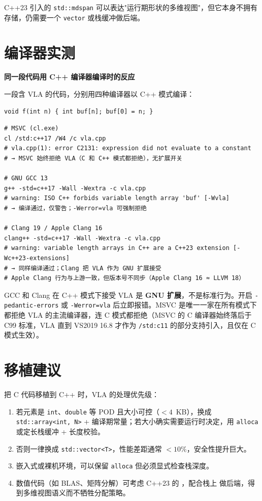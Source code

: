 \documentclass[12pt,a4paper,fontset=fandol]{ctexbook}
\newcommand{\clabel}{%
  \tcbox[on line,colback=cheadbg,colframe=cheadbg,
    boxrule=0pt,arc=1pt,left=2pt,right=2pt,top=1pt,bottom=1pt,
    colupper=white,fontupper=\scriptsize\bfseries]{C}}
\newcommand{\shelllabel}{%
  \tcbox[on line,colback=bashheadbg,colframe=bashheadbg,
    boxrule=0pt,arc=1pt,left=2pt,right=2pt,top=1pt,bottom=1pt,
    colupper=white,fontupper=\scriptsize\bfseries]{Shell}}
\newcommand{\cpp}[1]{C++#1}
\newcommand{\kw}[1]{\texttt{#1}}
\newcommand{\seqkw}[1]{\seqsplit{\texttt{#1}}}
\begin{document}
C++23 引入的 \kw{std::mdspan} 可以表达"运行期形状的多维视图"，但它本身不拥有存储，仍需要一个 \kw{vector} 或栈缓冲做后端。

\section{编译器实测}

\begin{compilerbox}
\textbf{同一段代码用 \cpp{} 编译器编译时的反应}
\end{compilerbox}

\clabel{} 一段含 VLA 的代码，分别用四种编译器以 \cpp{} 模式编译：
\begin{lstlisting}[style=cstyle]
void f(int n) { int buf[n]; buf[0] = n; }
\end{lstlisting}

\shelllabel{}
\begin{lstlisting}[style=bashstyle]
# MSVC (cl.exe)
cl /std:c++17 /W4 /c vla.cpp
# vla.cpp(1): error C2131: expression did not evaluate to a constant
# → MSVC 始终拒绝 VLA（C 和 C++ 模式都拒绝），无扩展开关

# GNU GCC 13
g++ -std=c++17 -Wall -Wextra -c vla.cpp
# warning: ISO C++ forbids variable length array 'buf' [-Wvla]
# → 编译通过，仅警告；-Werror=vla 可强制拒绝

# Clang 19 / Apple Clang 16
clang++ -std=c++17 -Wall -Wextra -c vla.cpp
# warning: variable length arrays in C++ are a C++23 extension [-Wc++23-extensions]
# → 同样编译通过；Clang 把 VLA 作为 GNU 扩展接受
# Apple Clang 行为与上游一致，但版本号不同步（Apple Clang 16 ≈ LLVM 18）
\end{lstlisting}

\begin{warning}
GCC 和 Clang 在 \cpp{} 模式下接受 VLA 是 \textbf{GNU 扩展}，不是标准行为。开启 \kw{-pedantic-errors} 或 \kw{-Werror=vla} 后立即报错。MSVC 是唯一一家在所有模式下都拒绝 VLA 的主流编译器，连 C 模式都拒绝（MSVC 的 C 编译器始终落后于 C99 标准，VLA 直到 VS2019 16.8 才作为 \kw{/std:c11} 的部分支持引入，且仅在 C 模式生效）。
\end{warning}

\section{移植建议}

把 C 代码移植到 \cpp{} 时，VLA 的处理优先级：

\begin{enumerate}
  \item 若元素是 \kw{int}、\kw{double} 等 POD 且大小可控（$< 4$~KB），换成 \kw{std::array<int, N>} + 编译期常量；若大小确实需要运行时决定，用 \kw{alloca} 或定长栈缓冲 + 长度校验。
  \item 否则一律换成 \kw{std::vector<T>}，性能差距通常 $<10\%$，安全性提升巨大。
  \item 嵌入式或裸机环境，可以保留 \kw{alloca} 但必须显式检查栈深度。
  \item 数值代码（如 BLAS、矩阵分解）可考虑 C++23 的 \seqkw{std::mdspan}，配合栈上 \seqkw{std::array} 做后端，得到多维视图语义而不牺牲分配策略。
\end{enumerate}
\end{document}
